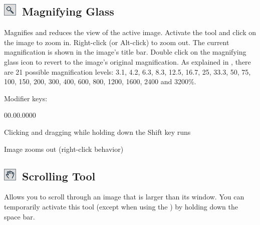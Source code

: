 \subsection[Magnifying Glass]{\noindent \textsf{\protect\includegraphics[bb=0bp 5bp 20bp 20bp,scale=0.6]{images/tools/Glass}}~Magnifying
Glass\label{sec:Magnifying-Glass}}

Magnifies and reduces the view of the active image. Activate the tool
and click on the image to  zoom in. Right-click (or Alt-click)
to zoom out. The current magnification is shown in the image's title
bar. Double click on the magnifying glass icon to revert to the image's
original magnification. As explained in \textsf{},
there are 21 possible magnification levels: 3.1, 4.2, 6.3, 8.3, 12.5,
16.7, 25, 33.3, 50, 75, 100, 150, 200, 300, 400, 600, 800, 1200, 1600,
2400 and 3200\%. 

Modifier keys:
\begin{lyxlist}{00.00.0000}
\item [{\mykeystroke{Shift}}] \noindent Clicking and dragging while holding
down the Shift key runs \textsf{}
\item [{\mykeystroke{Alt}}] \noindent Image zooms out (right-click behavior)
\end{lyxlist}



\subsection[Scrolling Tool]{\noindent \textsf{\protect\includegraphics[bb=0bp 5bp 20bp 20bp,scale=0.6]{images/tools/Hand}}~Scrolling
Tool\label{sec:Scrolling-Tool}}

Allows you to scroll through an image that is larger than its window.
You can temporarily activate this tool (except when using the )
by holding down the space bar.


